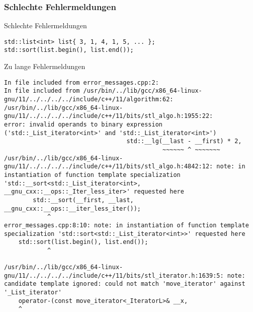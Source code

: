 \subsubsection{Schlechte Fehlermeldungen}

\begin{frame}[fragile]{Schlechte Fehlermeldungen}

    \begin{verbatim}
std::list<int> list{ 3, 1, 4, 1, 5, ... };
std::sort(list.begin(), list.end());
    \end{verbatim}
\end{frame}

\begin{frame}[fragile]{Zu lange Fehlermeldungen}
    \begin{verbatim}
In file included from error_messages.cpp:2:
In file included from /usr/bin/../lib/gcc/x86_64-linux-gnu/11/../../../../include/c++/11/algorithm:62:
/usr/bin/../lib/gcc/x86_64-linux-gnu/11/../../../../include/c++/11/bits/stl_algo.h:1955:22:
error: invalid operands to binary expression ('std::_List_iterator<int>' and 'std::_List_iterator<int>')
                                  std::__lg(__last - __first) * 2,
                                            ~~~~~~ ^ ~~~~~~~
/usr/bin/../lib/gcc/x86_64-linux-gnu/11/../../../../include/c++/11/bits/stl_algo.h:4842:12: note: in instantiation of function template specialization 'std::__sort<std::_List_iterator<int>, __gnu_cxx::__ops::_Iter_less_iter>' requested here
        std::__sort(__first, __last, __gnu_cxx::__ops::__iter_less_iter());
            ^
error_messages.cpp:8:10: note: in instantiation of function template specialization 'std::sort<std::_List_iterator<int>>' requested here
    std::sort(list.begin(), list.end());
            ^

/usr/bin/../lib/gcc/x86_64-linux-gnu/11/../../../../include/c++/11/bits/stl_iterator.h:1639:5: note: candidate template ignored: could not match 'move_iterator' against '_List_iterator'
    operator-(const move_iterator<_IteratorL>& __x,
    ^
    \end{verbatim}
\end{frame}

